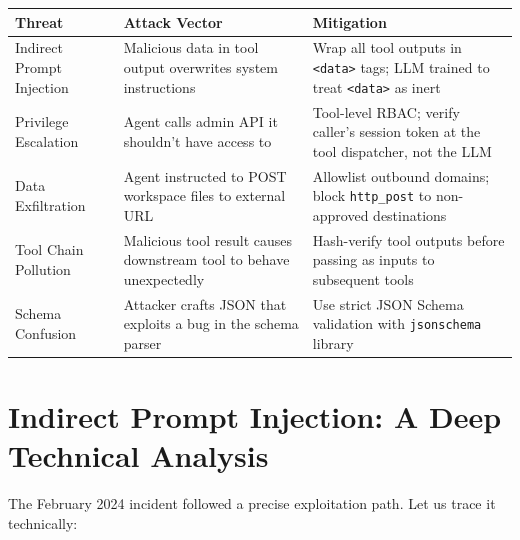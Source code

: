 \begin{center}
\begin{tabular}{|l|p{3.2cm}|p{3.2cm}|}
\hline
\textbf{Threat} & \textbf{Attack Vector} & \textbf{Mitigation} \\
\hline
Indirect Prompt Injection & Malicious data in tool output overwrites system instructions & Wrap all tool outputs in \texttt{<data>} tags; LLM trained to treat \texttt{<data>} as inert \\
\hline
Privilege Escalation & Agent calls admin API it shouldn't have access to & Tool-level RBAC; verify caller's session token at the tool dispatcher, not the LLM \\
\hline
Data Exfiltration & Agent instructed to POST workspace files to external URL & Allowlist outbound domains; block \texttt{http\_post} to non-approved destinations \\
\hline
Tool Chain Pollution & Malicious tool result causes downstream tool to behave unexpectedly & Hash-verify tool outputs before passing as inputs to subsequent tools \\
\hline
Schema Confusion & Attacker crafts JSON that exploits a bug in the schema parser & Use strict JSON Schema validation with \texttt{jsonschema} library \\
\hline
\end{tabular}
\end{center}

\section{Indirect Prompt Injection: A Deep Technical Analysis}

The February 2024 incident followed a precise exploitation path. Let us trace it technically:

